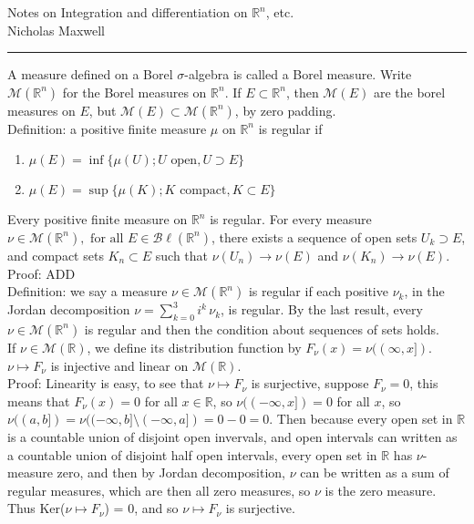 \documentclass[12pt]{article}
\newcommand{\fall}[0] { \textrm{ for all } }
\newcommand{\reals}[0] { \mathbb{R}}
\newcommand{\M}[0] { \mathcal{M} }
\newcommand{\Bl}[0] { \mathcal{B} \ell }
\newcommand{\rarw}[0] { \rightarrow }
\begin{document}
\begin{flushleft}
Notes on Integration and differentiation on $\reals^n$, etc. \\
Nicholas Maxwell\\
\end{flushleft}

\begin{flushleft}
\addvspace{5pt} \hrule
\end{flushleft}	

A measure defined on a Borel $\sigma$-algebra is called a Borel measure. Write $\M(\reals^n)$ for the Borel measures on $\reals^n$. If $E \subset \reals^n$, then $\M(E)$ are the borel measures on $E$, but $\M(E) \subset \M(\reals^n)$, by zero padding. \\

Definition: a positive finite measure $\mu$ on $\reals^n$ is regular if

\begin{enumerate}
\item
$\mu(E) = \inf \{ \mu(U) ; U \textrm{ open}, U \supset E \}$
\item
$\mu(E) = \sup \{ \mu(K) ; K \textrm{ compact}, K \subset E \}$
\end{enumerate}

Every positive finite measure on $\reals^n$ is regular. For every measure $\nu \in \M(\reals^n), \fall E \in \Bl(\reals^n)$, there exists a sequence of open sets $U_k \supset E$, and compact sets $K_n \subset E$ such that $\nu(U_n) \rarw \nu(E)$ and $\nu(K_n) \rarw \nu(E)$. \\

\noindent
Proof: ADD \\

Definition: we say a measure $\nu \in \M(\reals^n)$ is regular if each positive $\nu_k$, in the Jordan decomposition $\nu = \sum_{k=0}^3 i^k \, \nu_k$, is regular. By the last result, every $\nu \in \M(\reals^n)$ is regular and then the condition about sequences of sets holds. \\

If $\nu \in \M(\reals)$, we define its distribution function by $F_\nu (x) = \nu((\infty,x])$. $\nu \mapsto F_\nu$ is injective and linear on $\M(\reals)$. \\

\noindent
Proof: Linearity is easy, to see that $\nu \mapsto F_\nu$ is surjective, suppose $F_\nu = 0$, this means that $F_\nu(x) = 0$ for all $x \in \reals$, so $\nu((-\infty, x]) = 0$ for all $x$, so $\nu((a,b]) = \nu((-\infty,b] \setminus (-\infty,a]) = 0 - 0 = 0$. Then because every open set in $\reals$ is a countable union of disjoint open invervals, and open intervals can written as a countable union of disjoint half open intervals, every open set in $\reals$ has $\nu$-measure zero, and then by Jordan decomposition, $\nu$ can be written as a sum of regular measures, which are then all zero measures, so $\nu$ is the zero measure. Thus Ker($\nu \mapsto F_\nu$) = 0, and so $\nu \mapsto F_\nu$ is surjective. \\
\end{document}
